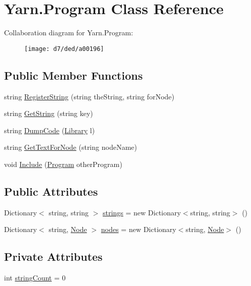 \hypertarget{a00067}{\section{Yarn.\-Program Class Reference}
\label{a00067}
}


Collaboration diagram for Yarn.\-Program\-:
\nopagebreak
\begin{figure}[H]
\begin{center}
\leavevmode
\texttt{[image: d7/ded/a00196]}
\end{center}
\end{figure}
\subsection*{Public Member Functions}
\begin{DoxyCompactItemize}
\item 
string \hyperlink{a00067_a13c9b747b37e404e2d0713468b2a78ff}{Register\-String} (string the\-String, string for\-Node)
\item 
string \hyperlink{a00067_a14737b93594c4aab25c59cb0a3c918f7}{Get\-String} (string key)
\item 
string \hyperlink{a00067_a2f5bb468ce53eb7bbe647e3c11ddbb61}{Dump\-Code} (\hyperlink{a00049}{Library} l)
\item 
string \hyperlink{a00067_aad8029f37832ff1985fad6a31e51afd8}{Get\-Text\-For\-Node} (string node\-Name)
\item 
void \hyperlink{a00067_afd3385ca1f7589b3b9dae3646e4fee84}{Include} (\hyperlink{a00067}{Program} other\-Program)
\end{DoxyCompactItemize}
\subsection*{Public Attributes}
\begin{DoxyCompactItemize}
\item 
Dictionary$<$ string, string $>$ \hyperlink{a00067_a91518fda7e41bf573f66c6946dd3b4cb}{strings} = new Dictionary$<$string, string$>$ ()
\item 
Dictionary$<$ string, \hyperlink{a00026_dd/dae/a00163}{Node} $>$ \hyperlink{a00067_a3f4928a577c88263ad016be259b175c4}{nodes} = new Dictionary$<$string, \hyperlink{a00026_dd/dae/a00163}{Node}$>$ ()
\end{DoxyCompactItemize}
\subsection*{Private Attributes}
\begin{DoxyCompactItemize}
\item 
int \hyperlink{a00067_a8ef1d10094ef00311aade6715ba78ec7}{string\-Count} = 0
\end{DoxyCompactItemize}


